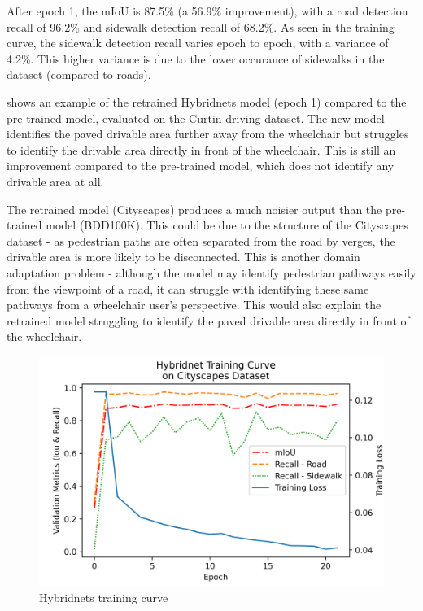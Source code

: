 After epoch 1, the mIoU is 87.5\% (a 56.9\% improvement), with a
road detection recall of 96.2\% and sidewalk detection recall of
68.2\%. As seen in the training curve, the sidewalk detection recall
varies epoch to epoch, with a variance of 4.2\%. This higher variance is
due to the lower occurance of sidewalks in the dataset (compared to roads).

 shows an example of the retrained Hybridnets model
(epoch 1) compared to the pre-trained model, evaluated on the Curtin driving dataset.
The new model identifies the paved drivable area further away from
the wheelchair but struggles to identify the drivable area directly in front of the wheelchair.
This is still an improvement compared to the pre-trained model, which does not identify any drivable
area at all.

The retrained model (Cityscapes) produces a much noisier output than the pre-trained model (BDD100K).
This could be due to the structure of the Cityscapes dataset - as pedestrian paths are often
separated from the road by verges, the drivable area is more likely to be disconnected.
This is another domain adaptation problem - although the model may identify pedestrian
pathways easily from the viewpoint of a road, it can struggle with identifying these
same pathways from a wheelchair user's perspective. This would also explain the
retrained model struggling to identify the paved drivable area directly in front of the wheelchair.

\begin{figure}[H]
    \centering
    \includegraphics[width=0.6\linewidth]{images/hybridnet_training_curve.png}
    \caption{Hybridnets training curve}
    \label{fig:hybridnet_training_curve}
\end{figure}

